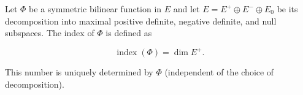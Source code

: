 Let $\Phi$ be a symmetric bilinear function in $E$ and let $E = E^+ \oplus E^- \oplus E_0$ be its decomposition into maximal positive definite, negative definite, and null subspaces. The index of $\Phi$ is defined as

$$\operatorname{index}(\Phi) = \dim E^+.$$

This number is uniquely determined by $\Phi$ (independent of the choice of decomposition).
